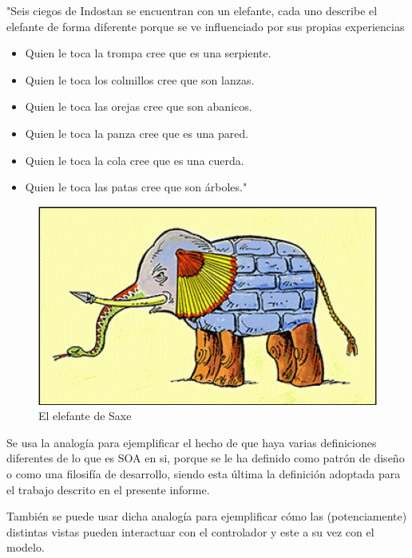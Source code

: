     "Seis ciegos de Indostan se encuentran con un elefante, cada uno describe el elefante de forma diferente porque se ve influenciado por sus propias experiencias
    
    \begin{itemize}
        \item Quien le toca la trompa cree que es una serpiente.
        \item Quien le toca los colmillos cree que son lanzas.
        \item Quien le toca las orejas cree que son abanicos.
        \item Quien le toca la panza cree que es una pared.
        \item Quien le toca la cola cree que es una cuerda.
        \item Quien le toca	las patas cree que son árboles."
    \end{itemize}
    

    \begin{figure}
        \begin{center}
            \includegraphics[scale=.75]{figures/Elefante}
        \end{center}
        \caption {El elefante de Saxe}
    \end{figure}

    Se usa la analogía para ejemplificar el hecho de que haya varias definiciones diferentes de lo que es SOA en si, porque se le ha definido como patrón de diseño o como una filosifía de desarrollo, siendo esta última la definición adoptada para el trabajo descrito en el presente informe.
    
    También se puede usar dicha analogía para ejemplificar cómo las (potenciamente) distintas vistas pueden interactuar con el controlador y este a su vez con el modelo.

    
\pagebreak